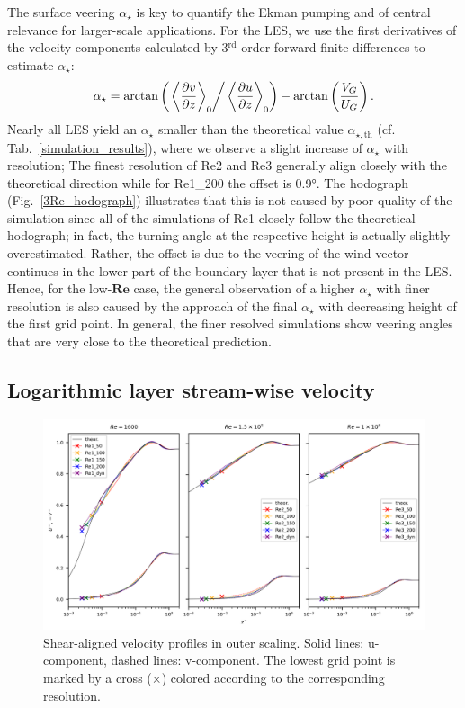 \documentclass[a4paper,11pt]{article}
\newcommand{\RE}{\mathbf{Re}}
\begin{document}
The surface veering $\alpha_\star$ is key to quantify the Ekman pumping and of central relevance for larger-scale applications. For the LES, we use the first derivatives of the velocity components calculated by 3$^\text{rd}$-order forward finite differences to estimate $\alpha_\star$:
\begin{align}
  \alpha_\star = \arctan\left(\left.\left\langle \frac{\partial v}{\partial z}\right\rangle_0\right/\left\langle \frac{\partial u}{\partial z}\right\rangle_0\right)-\arctan\left(\frac{V_G}{U_G}\right).
\end{align}
Nearly all LES yield an $\alpha_\star$ smaller than the theoretical value $\alpha_{\star,\text{th}}$ (cf. Tab.~\ref{simulation_results}), where we observe a slight increase of $\alpha_\star$ with resolution; The finest resolution of Re2 and Re3 generally align closely with the theoretical direction while for Re1\_200 the offset is 0.9°. The hodograph (Fig.~\ref{3Re_hodograph}) illustrates that this is not caused by poor quality of the simulation since all of the simulations of Re1 closely follow the theoretical hodograph; in fact, the turning angle at the respective height is actually slightly overestimated. Rather, the offset is due to the veering of the wind vector continues in the lower part of the boundary layer that is not present in the LES. Hence, for the low-$\RE$ case, the general observation of a higher $\alpha_\star$ with finer resolution is also caused by the approach of the final $\alpha_\star$ with decreasing height of the first grid point. In general, the finer resolved simulations show veering angles that are very close to the theoretical prediction.

\subsection{Logarithmic layer stream-wise velocity}
\label{vel_profiles}

\begin{figure}[ht]
  \centerline{
	  \includegraphics[width=\textwidth]{figures_2024/d3y_3Re_profiles_outer.png}
	}
  \caption{Shear-aligned velocity profiles in outer scaling. Solid lines: u-component, dashed lines: v-component. The lowest grid point is marked by a cross ($\times$) colored according to the corresponding resolution.}
  \label{velocity_outer}
\end{figure}
\end{document}
